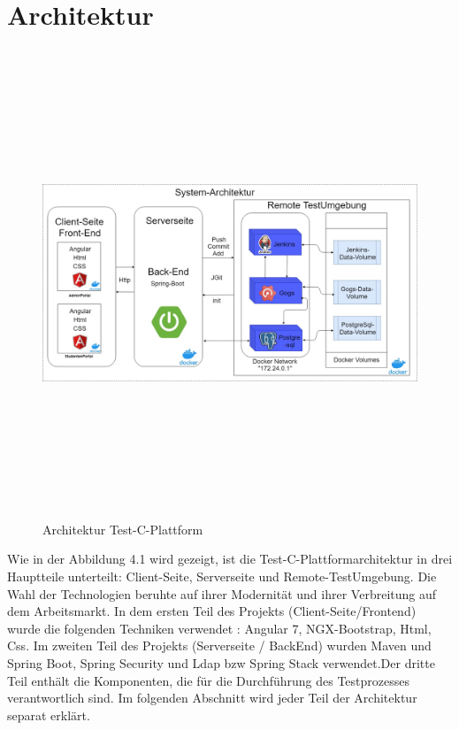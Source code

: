 \documentclass[a4paper,12pt,oneside]{book}
\begin{document}
\section{Architektur}
\begin{figure}[h!]
	\begin{center}
		\includegraphics[width=17cm, height=14cm]{Test-C-Plattform-Arch.jpg}
		\caption{Architektur Test-C-Plattform } 
		\label{ Architektur Test-C-Plattform } 
	\end{center}
\end{figure}
Wie in der Abbildung 4.1 wird gezeigt, ist die Test-C-Plattformarchitektur in drei Hauptteile unterteilt: Client-Seite, Serverseite und Remote-TestUmgebung.
\newline
Die Wahl der Technologien beruhte auf ihrer Modernität und ihrer Verbreitung auf dem Arbeitsmarkt. In dem ersten Teil des Projekts (Client-Seite/Frontend) wurde die folgenden Techniken verwendet : Angular 7, NGX-Bootstrap, Html, Css. Im zweiten Teil des Projekts (Serverseite / BackEnd) wurden Maven und Spring Boot, Spring Security und Ldap bzw Spring Stack verwendet.Der dritte Teil enthält die Komponenten, die für die Durchführung des Testprozesses verantwortlich sind.
\newpage
Im folgenden Abschnitt wird jeder Teil der Architektur separat erklärt.
\newpage
\end{document}
